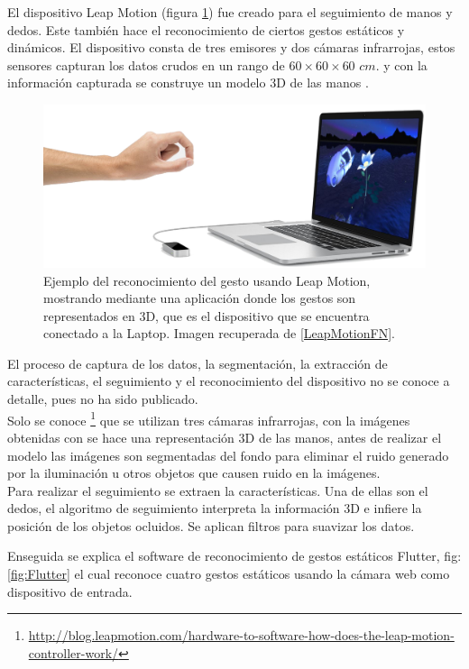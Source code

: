 El dispositivo Leap Motion (figura \ref{fig:LeapMotion}) fue creado para el seguimiento de manos y dedos. Este también hace el reconocimiento de ciertos gestos estáticos y dinámicos. El dispositivo consta de tres emisores y dos cámaras infrarrojas, estos sensores capturan los datos crudos en un rango de $60 \times 60 \times 60$ $cm.$ y con la información capturada se construye un modelo 3D de las manos \citep{Weichert2013}. 

\begin{figure}[h!]
\begin{center}
\includegraphics[scale=.3]{./Figures/LeapMotion.png}
\end{center}
\caption{Ejemplo del reconocimiento del gesto usando Leap Motion, mostrando mediante una aplicación donde los gestos son representados en 3D, que es el dispositivo que se encuentra conectado a la Laptop. Imagen recuperada de \ref{LeapMotionFN}.}
\label{fig:LeapMotion}
\end{figure}

El proceso de captura de los datos, la segmentación, la extracción de características, el seguimiento y el reconocimiento del dispositivo no se conoce a detalle, pues no ha sido publicado.\\ 
Solo se conoce \footnote{ \url{http://blog.leapmotion.com/hardware-to-software-how-does-the-leap-motion-controller-work/}} que se utilizan tres cámaras infrarrojas, con la imágenes obtenidas con se hace una representación 3D de las manos, antes de realizar el modelo las imágenes son segmentadas del fondo para eliminar el ruido generado por la iluminación u otros objetos que causen ruido en la imágenes. \\
Para realizar el seguimiento se extraen la características. Una de ellas son el dedos, el algoritmo de seguimiento interpreta la información 3D e infiere la posición de los objetos ocluidos. Se aplican filtros para suavizar los datos. 


Enseguida se explica el software de reconocimiento de gestos estáticos Flutter, fig:\ref{fig:Flutter} el cual reconoce cuatro gestos estáticos usando la cámara web como dispositivo de entrada. 

